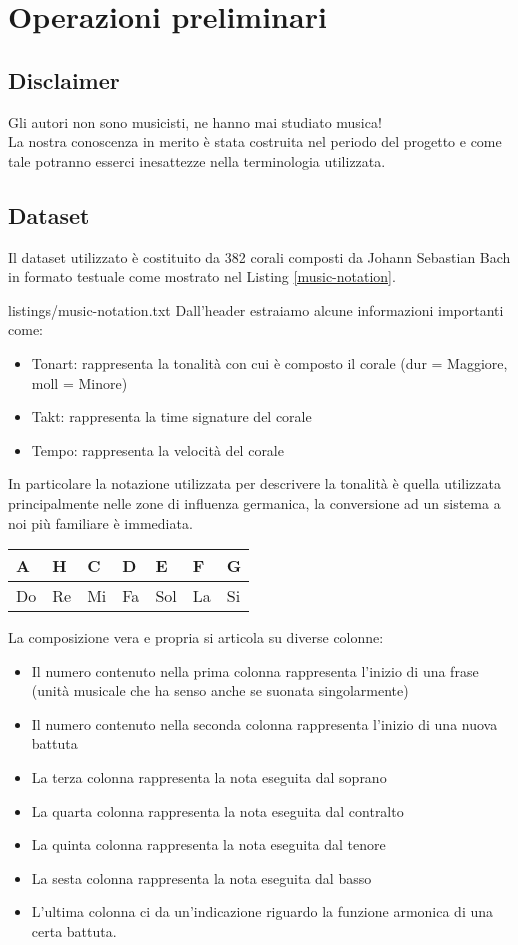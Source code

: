 \chapter{Operazioni preliminari}\label{ch:th-music}

\section{Disclaimer}
Gli autori non sono musicisti, ne hanno mai studiato musica! \\
La nostra conoscenza in merito è stata costruita nel periodo del progetto e come tale potranno esserci inesattezze nella terminologia utilizzata.

\section{Dataset}
Il dataset utilizzato è costituito da 382 corali composti da Johann Sebastian Bach in formato testuale come mostrato nel Listing \ref{music-notation}.

	{listings/music-notation.txt}
\noindent
Dall'header estraiamo alcune informazioni importanti come:
\begin{itemize}
\item Tonart: rappresenta la tonalità con cui è composto il corale (dur = Maggiore, moll = Minore)
\item Takt: rappresenta la time signature del corale
\item Tempo: rappresenta la velocità del corale
\end{itemize}
In particolare la notazione utilizzata per descrivere la tonalità è quella utilizzata principalmente nelle zone di influenza germanica, la conversione ad un sistema a noi più familiare è immediata.
\begin{table}[H]
\centering
\begin{tabular}{|l|l|l|l|l|l|l|}
\hline
A  & H  & C  & D  & E   & F  & G  \\ \hline
Do & Re & Mi & Fa & Sol & La & Si \\ \hline
\end{tabular}
\end{table}
\noindent
La composizione vera e propria si articola su diverse colonne:
\begin{itemize}
\item Il numero contenuto nella prima colonna rappresenta l'inizio di una frase (unità musicale che ha senso anche se suonata singolarmente)
\item Il numero contenuto nella seconda colonna rappresenta l'inizio di una nuova battuta
\item La terza colonna rappresenta la nota eseguita dal soprano
\item La quarta colonna rappresenta la nota eseguita dal contralto
\item La quinta colonna rappresenta la nota eseguita dal tenore
\item La sesta colonna rappresenta la nota eseguita dal basso
\item L'ultima colonna ci da un'indicazione riguardo la funzione armonica di una certa battuta.
\end{itemize}
